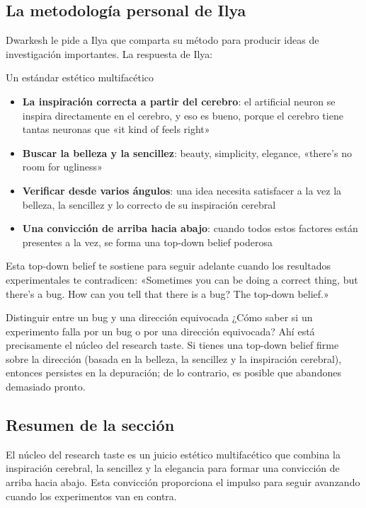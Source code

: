 \documentclass[a4paper]{article}
\begin{document}
\subsection{La metodología personal de Ilya}

Dwarkesh le pide a Ilya que comparta su método para producir ideas de investigación importantes. La respuesta de Ilya:

\begin{importantbox}{Un estándar estético multifacético}
\begin{itemize}
    \item \textbf{La inspiración correcta a partir del cerebro}: el artificial neuron se inspira directamente en el cerebro, y eso es bueno, porque el cerebro tiene tantas neuronas que «it kind of feels right»
    \item \textbf{Buscar la belleza y la sencillez}: beauty, simplicity, elegance, «there's no room for ugliness»
    \item \textbf{Verificar desde varios ángulos}: una idea necesita satisfacer a la vez la belleza, la sencillez y lo correcto de su inspiración cerebral
    \item \textbf{Una convicción de arriba hacia abajo}: cuando todos estos factores están presentes a la vez, se forma una top-down belief poderosa
\end{itemize}
Esta top-down belief te sostiene para seguir adelante cuando los resultados experimentales te contradicen: «Sometimes you can be doing a correct thing, but there's a bug. How can you tell that there is a bug? The top-down belief.»
\end{importantbox}

\begin{knowledgebox}{Distinguir entre un bug y una dirección equivocada}
¿Cómo saber si un experimento falla por un bug o por una dirección equivocada? Ahí está precisamente el núcleo del research taste. Si tienes una top-down belief firme sobre la dirección (basada en la belleza, la sencillez y la inspiración cerebral), entonces persistes en la depuración; de lo contrario, es posible que abandones demasiado pronto.
\end{knowledgebox}

\subsection{Resumen de la sección}

El núcleo del research taste es un juicio estético multifacético que combina la inspiración cerebral, la sencillez y la elegancia para formar una convicción de arriba hacia abajo. Esta convicción proporciona el impulso para seguir avanzando cuando los experimentos van en contra.
\end{document}
